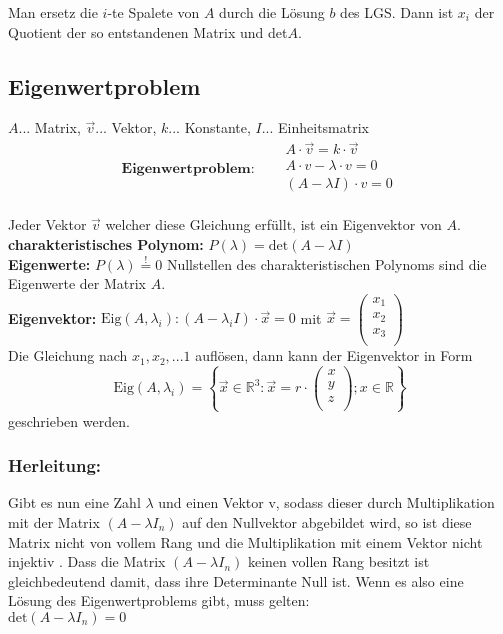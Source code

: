 Man ersetz die $i$-te Spalete von $A$ durch die Lösung $b$ des LGS. Dann ist $x_i$ der Quotient der so entstandenen Matrix und det$A$.

\subsection{Eigenwertproblem}
$A$... Matrix, $\vec{v}$... Vektor, $k$... Konstante, $I$... Einheitsmatrix\\
\[\textbf{Eigenwertproblem:}\quad \begin{aligned}
    &A\cdot \vec{v} = k \cdot \vec{v}\\
    &A\cdot v - \lambda \cdot v = 0\\
    & (A-\lambda I)\cdot v = 0 \\
\end{aligned}
\]

Jeder Vektor $\vec{v}$ welcher diese Gleichung erfüllt, ist ein Eigenvektor von $A$.\\

\textbf{charakteristisches Polynom:}
$P(\lambda) = \text{det}(A-\lambda I)$\\

\textbf{Eigenwerte:} $P(\lambda) \stackrel{!}{=} 0$ \qquad Nullstellen des charakteristischen Polynoms sind die Eigenwerte der Matrix $A$.\\

\textbf{Eigenvektor:} $\text{Eig}(A, \lambda_i):(A-\lambda_i I)\cdot \vec{x} = 0$
mit $\vec{x} = \begin{pmatrix}
    x_1\\
    x_2\\
    x_3\\
\end{pmatrix}$\\
Die Gleichung nach $x_1,x_2,...1$ auflösen, dann kann der Eigenvektor in Form \\
\[\text{Eig}(A,\lambda_i)= \left\{ \vec{x} \in \mathbb{R}^3 : \vec{x} = r \cdot
\begin{pmatrix}
    x\\
    y\\
    z\\
\end{pmatrix} ; x \in \mathbb{R} \right\}\]
geschrieben werden.

\subsubsection{Herleitung:}
Gibt es nun eine Zahl $\lambda$ und einen Vektor v, sodass dieser durch Multiplikation mit der Matrix $\left(A-\lambda I_n\right)$ auf den Nullvektor abgebildet wird, so ist diese Matrix nicht von vollem Rang und die Multiplikation mit einem Vektor nicht injektiv . Dass die Matrix $\left(A-\lambda I_n\right)$ keinen vollen Rang besitzt ist gleichbedeutend damit, dass ihre Determinante Null ist. Wenn es also eine Lösung des Eigenwertproblems gibt, muss gelten:\\

$\mathrm{det}\left(A-\lambda I_n\right)=0$\\

